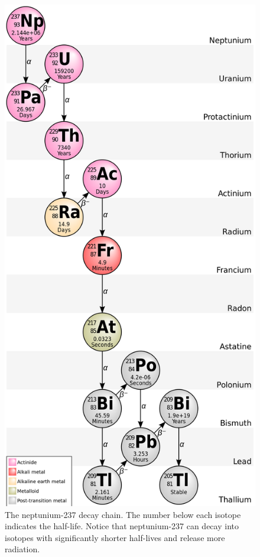 \documentclass[nofootinbib,preprint,aps]{revtex4-1}
\begin{document}
        \begin{figure}
            \centering
            \includegraphics[height=0.7\textheight]{chain.png}
            \caption{The neptunium-237 decay chain. The number below each isotope indicates the half-life.
            Notice that neptunium-237 can decay into isotopes with significantly shorter half-lives and
        release more radiation.\cite{chainpic}}
            \label{fig:chain}
        \end{figure}
\end{document}
